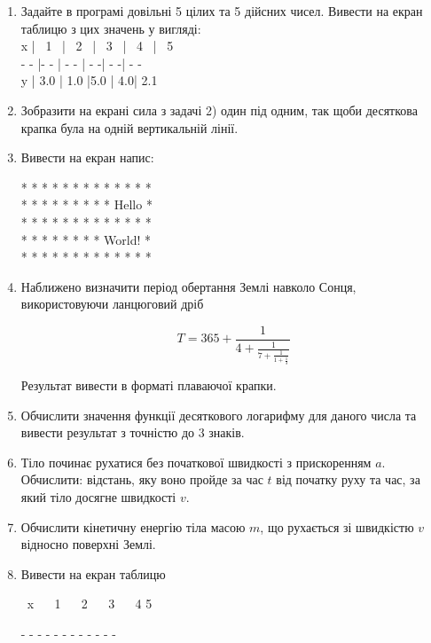 \documentclass[]{article}
\begin{document}
\begin{enumerate}
\def\labelenumi{\arabic{enumi}.}
\setcounter{enumi}{9}
\item
  Задайте в програмі довільні 5 цілих та 5 дійсних чисел. Вивести на екран таблицю
з цих значень у вигляді:\\

x | \  1 \  | \ 2 \  | \ 3 \ | \ 4 \  | \ 5 \ \\
- - |- - | - - | - -| - -| - - \\
y |  3.0  | 1.0 |5.0 | 4.0| 2.1\\


\item
  Зобразити на екрані сила з задачі 2) один під одним, так щоби десяткова крапка була
на одній вертикальній лінії.

\item
  Вивести на екран напис:

* * * * * * * * * * * * *\\
* * * * * * * * * Hello *\\
* * * * * * * * * * * * *\\ 
* * * * * * * * World!  *\\
* * * * * * * * * * * * *\\

\item
  Наближено визначити період обертання Землі навколо Сонця,
  використовуючи ланцюговий дріб

\[T = 365 + \frac{1}{4 + \frac{1}{7 + \frac{1}{1 + \frac{1}{3}}}}\]

Результат вивести в форматі плаваючої крапки.

\item
  Обчислити значення функції десяткового логарифму для даного числа та
  вивести результат з точністю до 3 знаків.
\item
  Тіло починає рухатися без початкової швидкості з прискоренням
  \(a\). Обчислити: відстань, яку воно пройде за час \(t\) від початку руху та
час, за який тіло досягне швидкості \(v\).

\item
  Обчислити кінетичну енергію тіла масою \(m\), що рухається зі
  швидкістю \(v\) відносно поверхні Землі.
\item
  Вивести на екран таблицю

\ x \ \textbar{} \  1 \ \textbar{} \  2 \ \textbar{} \ 3 \ \textbar{} \ 4 \textbar{} 5 

- - \textbar{} - - \textbar{} - - \textbar{} - - \textbar{} - - \textbar{} - - 


\end{enumerate}
\end{document}
